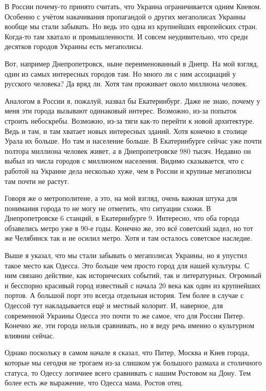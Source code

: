 В России почему-то принято считать, что Украина ограничивается одним Киевом.
Особенно с учётом накачивания пропагандой о других мегаполисах Украины вообще
мы стали забывать. Но ведь это одна из крупнейших европейских стран. Когда-то
там хватало и промышленности. И совсем неудивительно, что среди десятков
городов Украины есть мегаполисы.


Вот, например Днепропетровск, ныне переименованный в Днепр. На мой взгляд, один
из самых интересных городов там. Но много ли с ним ассоциаций у русского
человека? Да вряд ли. Хотя там проживает около миллиона человек.

Аналогом в России я, пожалуй, назвал бы Екатеринбург. Даже не знаю, почему у
меня эти города вызывают одинаковый интерес. Возможно, из-за попыток строить
небоскребы. Возможно, из-за тяги как-то перейти к новой архитектуре. Ведь и
там, и там хватает новых интересных зданий. Хотя конечно в столице Урала их
больше. Но там и население больше. В Екатеринбурге сейчас уже почти полтора
миллиона человек живет, а в Днепропетровске 980 тысяч. Недавно он выбыл из
числа городов с миллионом населения. Видимо сказывается, что с работой на
Украине дела несколько хуже, чем в России и крупные мегаполисы там почти не
растут.

Говоря же о метрополитене, а это, на мой взгляд, очень важная штука для
понимания города то не могу не отметить, что ситуации схожи. В Днепропетровске
6 станций, в Екатеринбурге 9. Интересно, что оба города обзавелись метро уже в
90-е годы. Конечно же, это всё советский задел, но тот же Челябинск так и не
осилил метро. Хотя и там осталось советское наследие.

Выше я указал, что мы стали забывать о мегаполисах Украины, но я упустил такое
место как Одесса. Это больше чем просто город для нашей культуры. С ним связано
действие, как исторических событий, так и литературных. Огромный и бесспорно
красивый город известный с начала 20 века как один из крупнейших портов. А
большой порт это всегда отдельная история. Тем более в случае с Одессой тут
накладывается ещё и местный колорит. И, наверное, для современной Украины
Одесса это почти то же самое, что для России Питер. Конечно же, эти города
нельзя сравнивать, но я веду речь именно о культурном влиянии сейчас.


Однако поскольку в самом начале я сказал, что Питер, Москва и Киев города,
которые мы сегодня не трогаем из-за слишком уж большого размаха и столичного
статуса, то Одессу логичнее всего сравнивать с нашим Ростовом на Дону. Тем
более есть же выражение, что Одесса мама, Ростов отец.

